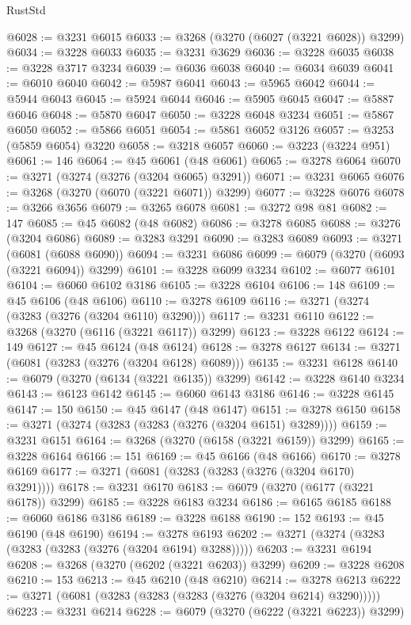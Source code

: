 \begin{lexlean}{RustStd}
\begin{coremodule}
@6028 := @3231 @6015
@6033 := @3268 (@3270 (@6027 (@3221 @6028)) @3299)
@6034 := @3228 @6033
@6035 := @3231 @3629
@6036 := @3228 @6035
@6038 := @3228 @3717 @3234
@6039 := @6036 @6038
@6040 := @6034 @6039
@6041 := @6010 @6040
@6042 := @5987 @6041
@6043 := @5965 @6042
@6044 := @5944 @6043
@6045 := @5924 @6044
@6046 := @5905 @6045
@6047 := @5887 @6046
@6048 := @5870 @6047
@6050 := @3228 @6048 @3234
@6051 := @5867 @6050
@6052 := @5866 @6051
@6054 := @5861 @6052 @3126
@6057 := @3253 (@5859 @6054) @3220
@6058 := @3218 @6057
@6060 := @3223 (@3224 @951)
@6061 := 146
@6064 := @45 @6061 (@48 @6061)
@6065 := @3278 @6064
@6070 := @3271 (@3274 (@3276 (@3204 @6065) @3291))
@6071 := @3231 @6065
@6076 := @3268 (@3270 (@6070 (@3221 @6071)) @3299)
@6077 := @3228 @6076
@6078 := @3266 @3656
@6079 := @3265 @6078
@6081 := @3272 @98 @81
@6082 := 147
@6085 := @45 @6082 (@48 @6082)
@6086 := @3278 @6085
@6088 := @3276 (@3204 @6086)
@6089 := @3283 @3291
@6090 := @3283 @6089
@6093 := @3271 (@6081 (@6088 @6090))
@6094 := @3231 @6086
@6099 := @6079 (@3270 (@6093 (@3221 @6094)) @3299)
@6101 := @3228 @6099 @3234
@6102 := @6077 @6101
@6104 := @6060 @6102 @3186
@6105 := @3228 @6104
@6106 := 148
@6109 := @45 @6106 (@48 @6106)
@6110 := @3278 @6109
@6116 := @3271 (@3274 (@3283 (@3276 (@3204 @6110) @3290)))
@6117 := @3231 @6110
@6122 := @3268 (@3270 (@6116 (@3221 @6117)) @3299)
@6123 := @3228 @6122
@6124 := 149
@6127 := @45 @6124 (@48 @6124)
@6128 := @3278 @6127
@6134 := @3271 (@6081 (@3283 (@3276 (@3204 @6128) @6089)))
@6135 := @3231 @6128
@6140 := @6079 (@3270 (@6134 (@3221 @6135)) @3299)
@6142 := @3228 @6140 @3234
@6143 := @6123 @6142
@6145 := @6060 @6143 @3186
@6146 := @3228 @6145
@6147 := 150
@6150 := @45 @6147 (@48 @6147)
@6151 := @3278 @6150
@6158 := @3271 (@3274 (@3283 (@3283 (@3276 (@3204 @6151) @3289))))
@6159 := @3231 @6151
@6164 := @3268 (@3270 (@6158 (@3221 @6159)) @3299)
@6165 := @3228 @6164
@6166 := 151
@6169 := @45 @6166 (@48 @6166)
@6170 := @3278 @6169
@6177 := @3271 (@6081 (@3283 (@3283 (@3276 (@3204 @6170) @3291))))
@6178 := @3231 @6170
@6183 := @6079 (@3270 (@6177 (@3221 @6178)) @3299)
@6185 := @3228 @6183 @3234
@6186 := @6165 @6185
@6188 := @6060 @6186 @3186
@6189 := @3228 @6188
@6190 := 152
@6193 := @45 @6190 (@48 @6190)
@6194 := @3278 @6193
@6202 := @3271 (@3274 (@3283 (@3283 (@3283 (@3276 (@3204 @6194) @3288)))))
@6203 := @3231 @6194
@6208 := @3268 (@3270 (@6202 (@3221 @6203)) @3299)
@6209 := @3228 @6208
@6210 := 153
@6213 := @45 @6210 (@48 @6210)
@6214 := @3278 @6213
@6222 := @3271 (@6081 (@3283 (@3283 (@3283 (@3276 (@3204 @6214) @3290)))))
@6223 := @3231 @6214
@6228 := @6079 (@3270 (@6222 (@3221 @6223)) @3299)

\end{coremodule}
\end{lexlean}
